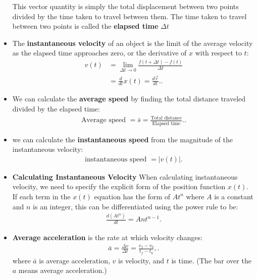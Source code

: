 \documentclass{report}
\begin{document}
\begin{itemize}
            This vector quantity is simply the total displacement between two points divided by the time taken to travel between them. The time taken to travel between two points is called the \textbf{elapsed time} $\Delta t$
        \item The \textbf{instantaneous velocity} of an object is the limit of the average velocity as the elapsed time approaches zero, or the derivative of $x$ with respect to $t$:
            \begin{align*}
                v(t) &= \lim\limits_{\Delta t \to 0}{\frac{f(t + \Delta t) - f(t)}{\Delta t}} \\
                 &= \frac{d}{dt}x(t) = \frac{d\vec{r}}{dt}.
            .\end{align*}
        \item We can calculate the \textbf{average speed} by finding the total distance traveled divided by the elapsed time:
            \begin{align*}
                \text{Average speed } = \bar{s} = \frac{\text{Total distance}}{\text{Elapsed time}}.
            .\end{align*}
        \item we can calculate the \textbf{instantaneous speed} from the magnitude of the instantaneous velocity:
            \begin{align*}
                \text{instantaneous speed } = \bigg\lvert v(t) \bigg\rvert
            .\end{align*}
        \item \textbf{Calculating Instantaneous Velocity}
            When calculating instantaneous velocity, we need to specify the explicit form of the position function $x(t)$. If each term in the $x(t)$ equation has the form of $A t^n$ where $A$ is a constant and $n$ is an integer, this can be differentiated using the power rule to be:
            \begin{align*}
                \frac{d(At^{n})}{dt}= Ant^{n-1}
            .\end{align*}
        \item \textbf{Average acceleration} is the rate at which velocity changes:
            \begin{align*}
                \bar{a} = \frac{\Delta v}{\Delta t} = \frac{v_f - v_0}{t_f - t_0},
            .\end{align*}
            where $\bar{a}$ is average acceleration, $v$ is velocity, and $t$ is time. (The bar over the $a$ means average acceleration.)
            \bigbreak \noindent 

\end{itemize}
\end{document}

